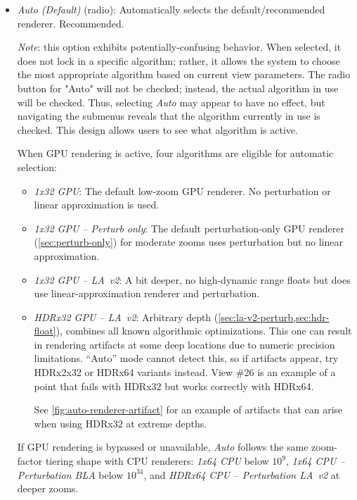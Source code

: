 \begin{itemize}
\begin{itemize}
      \item \emph{Auto (Default)} (radio): Automatically selects the
      default/recommended renderer.  Recommended.

      \emph{Note}: this option exhibits potentially-confusing behavior.  When
      selected, it does not lock in a specific algorithm; rather, it allows the
      system to choose the most appropriate algorithm based on current view
      parameters. The radio button for "Auto" will not be checked; instead, the
      actual algorithm in use will be checked.  Thus, selecting \emph{Auto} may
      appear to have no effect, but navigating the submenus reveals that the
      algorithm currently in use is checked.  This design allows users to see
      what algorithm is active.

      When GPU rendering is active, four algorithms are eligible for automatic
      selection:
      \begin{itemize}
        \item \emph{1x32 GPU}: The default low-zoom GPU renderer.  No
              perturbation or linear approximation is used.
        \item \emph{1x32 GPU -- Perturb only}: The default
              perturbation-only GPU renderer (\cref{sec:perturb-only}) for
              moderate zooms uses perturbation but no linear approximation.
        \item \emph{1x32 GPU -- LA~v2}: A bit deeper, no high-dynamic range
              floats but does use linear-approximation renderer and
              perturbation.
        \item \emph{HDRx32 GPU -- LA~v2}: Arbitrary depth (\cref{sec:la-v2-perturb,sec:hdr-float}), combines all known
              algorithmic optimizations.  This one can result in rendering
              artifacts at some deep locations due to numeric precision
              limitations.  ``Auto'' mode cannot detect this, so if artifacts appear, try
              HDRx2x32 or HDRx64 variants instead.  View \#26 is an example of a
              point that fails with HDRx32 but works correctly with HDRx64.

              See \cref{fig:auto-renderer-artifact} for an example of
              artifacts that can arise when using HDRx32 at extreme depths.
      \end{itemize}
      If GPU rendering is bypassed or unavailable, \emph{Auto} follows the same
      zoom-factor tiering shape with CPU renderers: \emph{1x64 CPU} below
      $10^9$, \emph{1x64 CPU -- Perturbation BLA} below $10^{34}$, and
      \emph{HDRx64 CPU -- Perturbation LA~v2} at deeper zooms.


\end{itemize}
\end{itemize}
